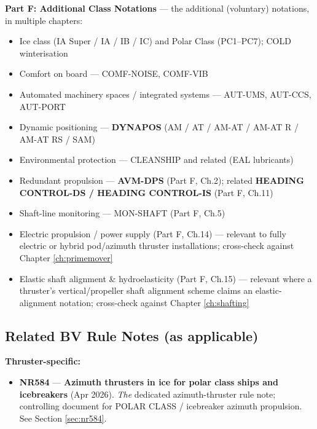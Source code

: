 \documentclass[11pt,a4paper]{report}
\begin{document}
\textbf{Part F: Additional Class Notations} --- the additional (voluntary)
notations, in multiple chapters:
\begin{itemize}[leftmargin=*]
\item Ice class (IA Super / IA / IB / IC) and Polar Class (PC1--PC7); COLD winterisation
\item Comfort on board --- COMF-NOISE, COMF-VIB
\item Automated machinery spaces / integrated systems --- AUT-UMS, AUT-CCS, AUT-PORT
\item Dynamic positioning --- \textbf{DYNAPOS} (AM / AT / AM-AT / AM-AT R / AM-AT RS / SAM)
\item Environmental protection --- CLEANSHIP and related (EAL lubricants)
\item Redundant propulsion --- \textbf{AVM-DPS} (Part F, Ch.2); related \textbf{HEADING CONTROL-DS / HEADING CONTROL-IS} (Part F, Ch.11)
\item Shaft-line monitoring --- MON-SHAFT (Part F, Ch.5)
\item Electric propulsion / power supply (Part F, Ch.14) --- relevant to fully electric or hybrid pod/azimuth thruster installations; cross-check against Chapter \ref{ch:primemover}
\item Elastic shaft alignment \& hydroelasticity (Part F, Ch.15) --- relevant where a thruster's vertical/propeller shaft alignment scheme claims an elastic-alignment notation; cross-check against Chapter \ref{ch:shafting}
\end{itemize}

\vspace{0.2cm}
\noindent{}

\subsection{Related BV Rule Notes (as applicable)}

\textbf{Thruster-specific:}
\begin{itemize}[leftmargin=*]
\item \textbf{NR584} --- \textbf{Azimuth thrusters in ice for polar class ships
and icebreakers} (Apr 2026). \emph{The} dedicated azimuth-thruster rule note;
controlling document for POLAR CLASS / icebreaker azimuth propulsion. See
Section \ref{sec:nr584}.
\end{itemize}
\end{document}
